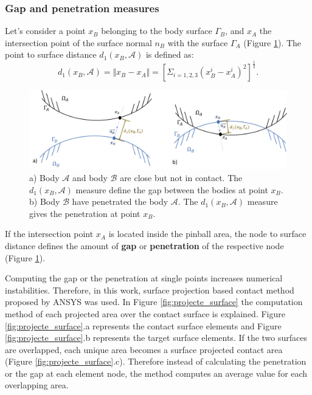  
 \subsubsection*{Gap and penetration measures} 
  Let's consider a point $x_B$ belonging to the body surface $\Gamma_B$, and $x_A$ the intersection point of the surface normal $n_B$ with the surface $\Gamma_A$ (Figure \ref{gap_penetration}). The point to surface distance $d_1(x_B,\mathcal{A})$  is defined as:
\begin{equation}
\label{normalContactdistance}
d_1(x_B,\mathcal{A}) = \Vert x_B-x_A \Vert = \left[  \Sigma_{i={1,2,3}}\left( x_B^i - x_A^i \right)^2\right]^{\frac{1}{2}}.
\end{equation}


\begin{figure}[!h]
\centering
\includegraphics[width=1\textwidth,keepaspectratio]{figures/gap_penetration.jpg}
\caption{a) Body $\mathcal{A}$ and body $\mathcal{B}$ are close but not in contact. The $d_1(x_B,\mathcal{A})$ measure define the gap between the bodies at point $x_B$.  b) Body $\mathcal{B}$ have penetrated the body $\mathcal{A}$. The $d_1(x_B,\mathcal{A})$ measure gives the penetration at point $x_B$.}
\label{gap_penetration}
\end{figure}

If the intersection point $x_A$ is located inside the pinball area, the node to surface distance defines the amount of \textbf{gap} or \textbf{penetration} of the respective node (Figure \ref{gap_penetration}).
 
Computing the gap or the penetration at single points increases numerical instabilities.  Therefore, in this work, surface projection based contact method proposed by ANSYS was used. In Figure \ref{fig:projecte_surface} the computation method of each projected area over the contact surface is explained. Figure \ref{fig:projecte_surface}.a represents the contact surface elements and Figure \ref{fig:projecte_surface}.b represents the target surface elements.  If the two surfaces are overlapped, each unique area becomes a surface projected contact area (Figure \ref{fig:projecte_surface}.c). Therefore instead of calculating  the penetration or the gap at each element node, the method computes an average value for each overlapping area.



